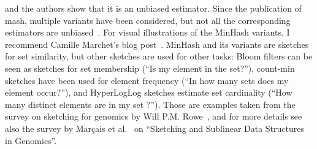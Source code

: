 and the authors show that it is an unbiased estimator. Since the publication of mash, multiple variants have been considered, but not all the corresponding estimators are unbiased~\cite{10.1093/bioinformatics/btac244}. For visual illustrations of the MinHash variants, I recommend Camille Marchet's blog post~\cite{camsketch}.
%
MinHash and its variants are sketches for set similarity, but other sketches are used for other tasks: Bloom filters can be seen as sketches for set membership (``Is my element in the set?''), count-min sketches have been used for element frequency (``In how many sets does my element occur?''), and HyperLogLog sketches estimate set cardinality (``How many distinct elements are in my set ?''). Those are examples taken from the survey on sketching for genomics by Will P.M. Rowe~\cite{rowe2019levee}, and for more details see also the survey by Marçais et al.~\cite{marccais2019sketching} on ``Sketching and Sublinear Data Structures in Genomics''.

